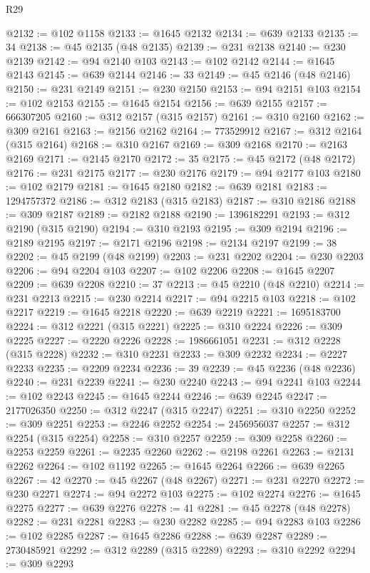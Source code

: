 \begin{lexlean}{R29}
\begin{coremodule}
@2132 := @102 @1158
@2133 := @1645 @2132
@2134 := @639 @2133
@2135 := 34
@2138 := @45 @2135 (@48 @2135)
@2139 := @231 @2138
@2140 := @230 @2139
@2142 := @94 @2140 @103
@2143 := @102 @2142
@2144 := @1645 @2143
@2145 := @639 @2144
@2146 := 33
@2149 := @45 @2146 (@48 @2146)
@2150 := @231 @2149
@2151 := @230 @2150
@2153 := @94 @2151 @103
@2154 := @102 @2153
@2155 := @1645 @2154
@2156 := @639 @2155
@2157 := 666307205
@2160 := @312 @2157 (@315 @2157)
@2161 := @310 @2160
@2162 := @309 @2161
@2163 := @2156 @2162
@2164 := 773529912
@2167 := @312 @2164 (@315 @2164)
@2168 := @310 @2167
@2169 := @309 @2168
@2170 := @2163 @2169
@2171 := @2145 @2170
@2172 := 35
@2175 := @45 @2172 (@48 @2172)
@2176 := @231 @2175
@2177 := @230 @2176
@2179 := @94 @2177 @103
@2180 := @102 @2179
@2181 := @1645 @2180
@2182 := @639 @2181
@2183 := 1294757372
@2186 := @312 @2183 (@315 @2183)
@2187 := @310 @2186
@2188 := @309 @2187
@2189 := @2182 @2188
@2190 := 1396182291
@2193 := @312 @2190 (@315 @2190)
@2194 := @310 @2193
@2195 := @309 @2194
@2196 := @2189 @2195
@2197 := @2171 @2196
@2198 := @2134 @2197
@2199 := 38
@2202 := @45 @2199 (@48 @2199)
@2203 := @231 @2202
@2204 := @230 @2203
@2206 := @94 @2204 @103
@2207 := @102 @2206
@2208 := @1645 @2207
@2209 := @639 @2208
@2210 := 37
@2213 := @45 @2210 (@48 @2210)
@2214 := @231 @2213
@2215 := @230 @2214
@2217 := @94 @2215 @103
@2218 := @102 @2217
@2219 := @1645 @2218
@2220 := @639 @2219
@2221 := 1695183700
@2224 := @312 @2221 (@315 @2221)
@2225 := @310 @2224
@2226 := @309 @2225
@2227 := @2220 @2226
@2228 := 1986661051
@2231 := @312 @2228 (@315 @2228)
@2232 := @310 @2231
@2233 := @309 @2232
@2234 := @2227 @2233
@2235 := @2209 @2234
@2236 := 39
@2239 := @45 @2236 (@48 @2236)
@2240 := @231 @2239
@2241 := @230 @2240
@2243 := @94 @2241 @103
@2244 := @102 @2243
@2245 := @1645 @2244
@2246 := @639 @2245
@2247 := 2177026350
@2250 := @312 @2247 (@315 @2247)
@2251 := @310 @2250
@2252 := @309 @2251
@2253 := @2246 @2252
@2254 := 2456956037
@2257 := @312 @2254 (@315 @2254)
@2258 := @310 @2257
@2259 := @309 @2258
@2260 := @2253 @2259
@2261 := @2235 @2260
@2262 := @2198 @2261
@2263 := @2131 @2262
@2264 := @102 @1192
@2265 := @1645 @2264
@2266 := @639 @2265
@2267 := 42
@2270 := @45 @2267 (@48 @2267)
@2271 := @231 @2270
@2272 := @230 @2271
@2274 := @94 @2272 @103
@2275 := @102 @2274
@2276 := @1645 @2275
@2277 := @639 @2276
@2278 := 41
@2281 := @45 @2278 (@48 @2278)
@2282 := @231 @2281
@2283 := @230 @2282
@2285 := @94 @2283 @103
@2286 := @102 @2285
@2287 := @1645 @2286
@2288 := @639 @2287
@2289 := 2730485921
@2292 := @312 @2289 (@315 @2289)
@2293 := @310 @2292
@2294 := @309 @2293

\end{coremodule}
\end{lexlean}

